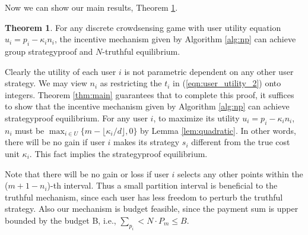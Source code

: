 \documentclass[conference]{IEEEtran}
\theoremstyle{definition}
\newtheorem{theorem}{Theorem}
\begin{document}
{Now we can show our main results, Theorem \ref{thm:discrete}.
\begin{theorem}
\label{thm:discrete}
For any discrete crowdsensing game with user utility equation $u_i = p_i - \kappa_in_i$, the incentive mechanism given by Algorithm \ref{alg:np} can achieve group strategyproof and $N$-truthful equilibrium.
\end{theorem}
\begin{IEEEproof}
Clearly the utility of each user $i$ is not parametric dependent on any other user strategy. We may view $n_i$ as restricting the $t_i$ in (\ref{eqn:user_utility_2}) onto integers. %
Theorem \ref{thm:main} guarantees that to complete this proof, it suffices to show that the incentive mechanism given by Algorithm \ref{alg:np} can achieve strategyproof equilibrium. For any user $i$, to maximize its utility $u_i = p_i - \kappa_in_i$, $n_i$ must be $\max_{i\in U}\{m-\lfloor \kappa_i/d \rfloor, 0\}$ by Lemma \ref{lem:quadratic}. In other words, there will be no gain if user $i$ makes its strategy $s_i$ different from the true cost unit $\kappa_i$. This fact implies the strategyproof equilibrium.
\end{IEEEproof}
}
{\color{black}Note that there will be no gain or loss if user $i$ selects any other points within the ($m+1-n_i$)-th interval. Thus a small partition interval is beneficial to the truthful mechanism, since each user has less freedom to perturb the truthful strategy. }
{\color{blue}Also our mechanism is budget feasible, since the payment sum is upper bounded by the budget B, i.e., $\sum_{p_i} < N \cdot P_m \leq B$.}
\end{document}
